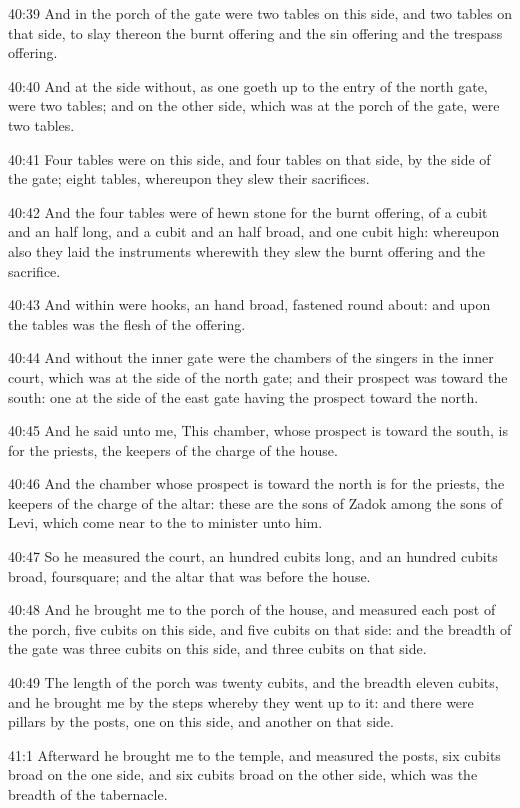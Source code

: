 40:39 And in the porch of the gate were two tables on this side, and
two tables on that side, to slay thereon the burnt offering and the
sin offering and the trespass offering.

40:40 And at the side without, as one goeth up to the entry of the
north gate, were two tables; and on the other side, which was at the
porch of the gate, were two tables.

40:41 Four tables were on this side, and four tables on that side, by
the side of the gate; eight tables, whereupon they slew their
sacrifices.

40:42 And the four tables were of hewn stone for the burnt offering,
of a cubit and an half long, and a cubit and an half broad, and one
cubit high: whereupon also they laid the instruments wherewith they
slew the burnt offering and the sacrifice.

40:43 And within were hooks, an hand broad, fastened round about: and
upon the tables was the flesh of the offering.

40:44 And without the inner gate were the chambers of the singers in
the inner court, which was at the side of the north gate; and their
prospect was toward the south: one at the side of the east gate having
the prospect toward the north.

40:45 And he said unto me, This chamber, whose prospect is toward the
south, is for the priests, the keepers of the charge of the house.

40:46 And the chamber whose prospect is toward the north is for the
priests, the keepers of the charge of the altar: these are the sons of
Zadok among the sons of Levi, which come near to the \LORD to minister
unto him.

40:47 So he measured the court, an hundred cubits long, and an hundred
cubits broad, foursquare; and the altar that was before the house.

40:48 And he brought me to the porch of the house, and measured each
post of the porch, five cubits on this side, and five cubits on that
side: and the breadth of the gate was three cubits on this side, and
three cubits on that side.

40:49 The length of the porch was twenty cubits, and the breadth
eleven cubits, and he brought me by the steps whereby they went up to
it: and there were pillars by the posts, one on this side, and another
on that side.

41:1 Afterward he brought me to the temple, and measured the posts,
six cubits broad on the one side, and six cubits broad on the other
side, which was the breadth of the tabernacle.

